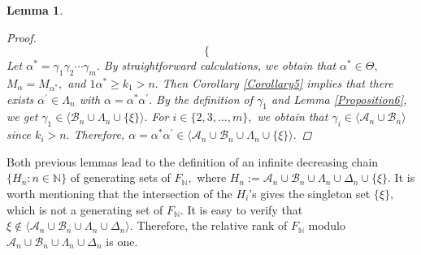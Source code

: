 \documentclass[11pt]{article}
\theoremstyle{plain}
\newtheorem{lemma}[theorem]{Lemma}
\theoremstyle{definition}
\begin{document}
\begin{lemma}
\begin{proof}
$$\begin{cases}
\end{cases}$$
Let $\alpha^{*}=\gamma_{1}\gamma_{2}\cdots\gamma_{m}.$ By straightforward calculations, we obtain that $\alpha^{*}\in\Theta,$ $M_{\alpha}=M_{\alpha^{*}},$ and $1\alpha^{*}\geq k_{1}> n.$ Then Corollary \ref{Corollary5} implies that there exists $\alpha^{'}\in\Lambda_{n}$ with $\alpha=\alpha^{*}\alpha^{'}.$ By the definition of $\gamma_{1}$ and Lemma \ref{Proposition6}, we get $\gamma_{1}\in\langle \mathcal{B}_{n}\cup\Lambda_{n}\cup\{\xi\}\rangle.$ For $i\in\{2,3,\ldots,m\},$ we obtain that $\gamma_{i}\in\langle \mathcal{A}_{n}\cup\mathcal{B}_{n}\rangle$ since $k_{i}> n.$ Therefore, $\alpha=\alpha^{*}\alpha^{'}\in\langle \mathcal{A}_{n}\cup\mathcal{B}_{n}\cup\Lambda_{n}\cup\{\xi\}\rangle.$
\end{proof}
\end{lemma}
Both previous lemmas lead to the definition of an infinite decreasing chain $\{H_{n}:n\in\mathbb{N}\}$ of generating sets of $F_{\mathbb{N}},$ where $H_{n}:=\mathcal{A}_{n}\cup\mathcal{B}_{n}\cup\Lambda_{n}\cup\Delta_{n}\cup\{\xi\}.$ It is worth mentioning  that the intersection of the $H_{i}$'s gives the singleton set $\{\xi\},$ which is not a generating set of $F_{\mathbb{N}}.$ It is easy to verify that $\xi\not\in\langle\mathcal{A}_{n}\cup\mathcal{B}_{n}\cup\Lambda_{n}\cup\Delta_{n}\rangle.$ Therefore, the relative rank of $F_{\mathbb{N}}$ modulo $\mathcal{A}_{n}\cup\mathcal{B}_{n}\cup\Lambda_{n}\cup\Delta_{n}$ is one.
\end{document}
